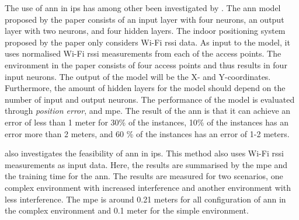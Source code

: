 The use of \gls{ann} in \gls{ips} has among other been investigated by \cite{ANN01}. The \gls{ann} model proposed by the paper consists of an input layer with four neurons, an output layer with two neurons, and four hidden layers. The indoor positioning system proposed by the paper only considers Wi-Fi \gls{rssi} data. As input to the model, it uses normalised Wi-Fi \gls{rssi} measurements from each of the access points. The environment in the paper consists of four access points and thus results in four input neurons. The output of the model will be the X- and Y-coordinates. Furthermore, the amount of hidden layers for the model should depend on the number of input and output neurons. The performance of the model is evaluated through \textit{position error}, and \gls{mpe}. The result of the \gls{ann} is that it can achieve an error of less than 1 meter for 30\% of the instances, 10\% of the instances has an error more than 2 meters, and 60 \% of the instances has an error of 1-2 meters. 

\cite{ANN02} also investigates the feasibility of \gls{ann} in \gls{ips}. This method also uses Wi-Fi \gls{rssi} measurements as input data. Here, the results are summarised by the \gls{mpe} and the training time for the \gls{ann}. The results are measured for two scenarios, one complex environment with increased interference and another environment with less interference. The \gls{mpe} is around 0.21 meters for all configuration of \gls{ann} in the complex environment and 0.1 meter for the simple environment. 


